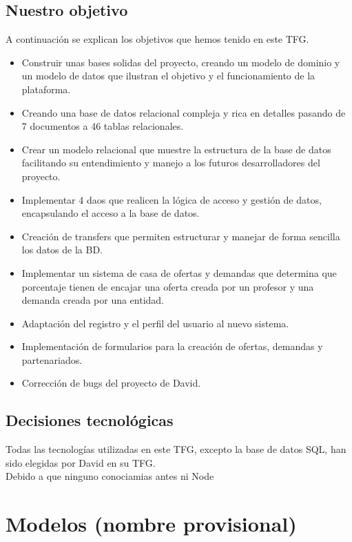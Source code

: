 \documentclass{article}
\begin{document}
\subsection{Nuestro objetivo}
A continuación se explican los objetivos que hemos tenido en este TFG.
\begin{itemize} 
	\item Construir unas bases solidas del proyecto, creando un modelo de dominio y un modelo de datos que ilustran el objetivo y el funcionamiento de la plataforma.
	\item Creando una base de datos relacional compleja y rica en detalles pasando de 7 documentos a 46 tablas relacionales.
	\item Crear un modelo relacional que muestre la estructura de la base de datos facilitando su entendimiento y manejo a los futuros desarrolladores del proyecto.
	\item Implementar 4 daos que realicen la lógica de acceso y gestión de datos, encapsulando el acceso a la base de datos.
	\item Creación de transfers que permiten estructurar y manejar de forma sencilla los datos de la BD.
	\item Implementar un sistema de casa de ofertas y demandas que determina que porcentaje tienen de encajar una oferta creada por un profesor y una demanda creada por una entidad.
	\item Adaptación del registro y el perfil del usuario al nuevo sistema.
	\item Implementación de formularios para la creación de ofertas, demandas y partenariados.
	\item Corrección de bugs del proyecto de David.
\end{itemize}
 

\subsection{Decisiones tecnológicas}
Todas las tecnologías utilizadas en este TFG, excepto la base de datos SQL, han sido elegidas por David en su TFG.\\
Debido a que ninguno conociamias antes ni Node

\section{Modelos (nombre provisional)}
\end{document}
